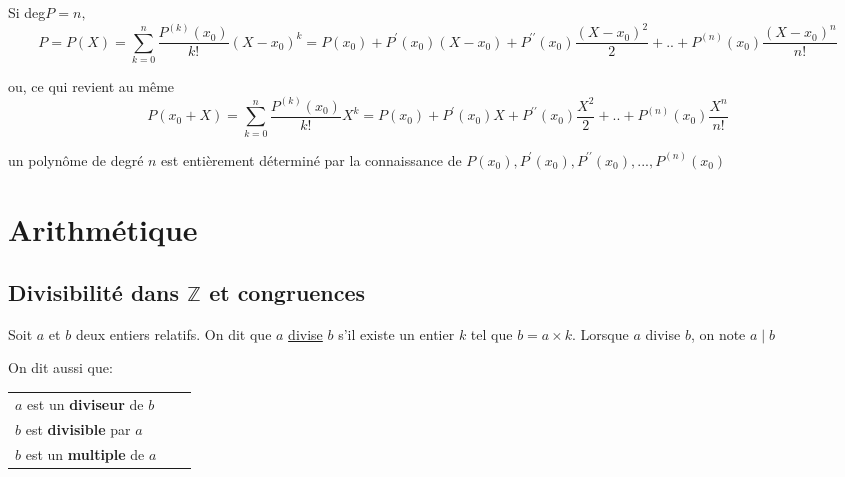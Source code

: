 \documentclass[french]{book}
\begin{document}
\bigskip
\begin{prop}
Si deg$P=n,$%
\begin{equation*}
P=P\left( X\right) =\underset{k=0}{\overset{n}{\sum }}\dfrac{P^{\left(
k\right) }\left( x_{0}\right) }{k!}\left( X-x_{0}\right) ^{k}=P\left(
x_{0}\right) +P^{\prime }\left( x_{0}\right) \left( X-x_{0}\right)
+P^{\prime \prime }\left( x_{0}\right) \dfrac{\left( X-x_{0}\right) ^{2}}{2}%
+..+P^{\left( n\right) }\left( x_{0}\right) \dfrac{\left( X-x_{0}\right) ^{n}%
}{n!}
\end{equation*}

ou, ce qui revient au m\^{e}me 
\begin{equation*}
P\left( x_{0}+X\right) =\underset{k=0}{\overset{n}{\sum }}\dfrac{P^{\left(
k\right) }\left( x_{0}\right) }{k!}X^{k}=P\left( x_{0}\right) +P^{\prime
}\left( x_{0}\right) X+P^{\prime \prime }\left( x_{0}\right) \dfrac{X^{2}}{2}%
+..+P^{\left( n\right) }\left( x_{0}\right) \dfrac{X^{n}}{n!}
\end{equation*}

\end{prop}

\begin{cor}

un polyn\^{o}me de degr\'{e} $n$ est enti\`{e}rement d\'{e}termin\'{e} par
la connaissance de $P\left( x_{0}\right) ,P^{\prime }\left( x_{0}\right)
,P^{\prime \prime }\left( x_{0}\right) ,...,P^{\left( n\right) }\left(
x_{0}\right) $
\end{cor}

\chapter{Arithmétique}

\section{Divisibilité dans $\mathbb{Z}$ et congruences}

 \begin{defn}
Soit $a$ et $b$ deux entiers relatifs.
On dit que $a$ \underline{divise} $b$ s'il existe un entier $k$ tel que $b=a\times k$.
Lorsque $a$ divise $b$, on note $a\mid b$ 

On dit aussi que: 
\begin{tabular}[t]{lll}$a$ est un \textbf{diviseur} de $b$\\$b$ est \textbf{divisible} par $a$\\$b$ est un    \textbf{multiple} de $a$
\end{tabular}

\end{defn}
\end{document}
